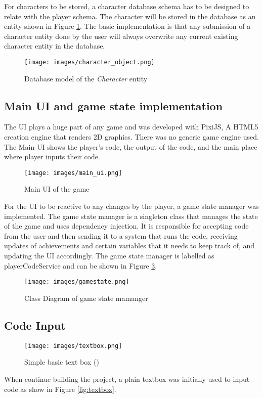 For characters to be stored, a character database schema has to be designed to relate with the player schema. The character will be stored in the database as an entity shown in Figure \ref{fig:character}. The basic implementation is that any submission of a character entity done by the user will always overwrite any current existing character entity in the database.
\begin{figure}
    \centering
    \texttt{[image: images/character\_object.png]}
    \caption{Database model of the \textit{Character} entity}
    \label{fig:character}
\end{figure}

\subsection{Main UI and game state implementation}
The UI plays a huge part of any game and was developed with PixiJS, A HTML5 creation engine that renders 2D graphics. There was no generic game engine used. The Main UI shows the player's code, the output of the code, and the main place where player inputs their code.

\begin{figure}[H]
    \centering
    \texttt{[image: images/main\_ui.png]}
    \caption{Main UI of the game}    
    \label{fig:main_ui}
\end{figure}
For the UI to be reactive to any changes by the player, a game state manager was implemented. The game state manager is a singleton class that manages the state of the game and uses dependency injection. It is responsible for accepting code from the user and then sending it to a system that runs the code, receiving updates of achievements and certain variables that it needs to keep track of, and updating the UI accordingly. The game state manager is labelled as playerCodeService and can be shown in Figure \ref{fig:game_state}.
\begin{figure}[H]
    \centering
    \texttt{[image: images/gamestate.png]}
    \caption{Class Diagram of game state mamanger}    
    \label{fig:game_state}
\end{figure}

\subsection{Code Input}
\begin{wrapfigure}{r}{0.5\textwidth}
    \centering
    \texttt{[image: images/textbox.png]}
    \caption{Simple basic text box (\cite{azatbekuly2023enhancing})}
\end{wrapfigure}
When continue building the project, a plain textbox was initially used to input code as show in Figure \ref{fig:textbox}. 

